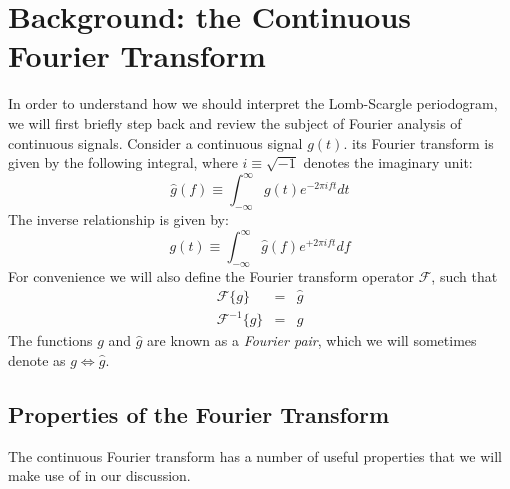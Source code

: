 \documentclass[preprint]{aastex}
\newcommand{\eqlabel}[1]{\label{eq:#1}}
\newcommand{\sectlabel}[1]{\label{sect:#1}}
\begin{document}
\section{Background: the Continuous Fourier Transform}
\sectlabel{continuous-fourier-transform}

In order to understand how we should interpret the Lomb-Scargle periodogram, we will first briefly step back and review the subject of Fourier analysis of continuous signals.
Consider a continuous signal $g(t)$.
its Fourier transform is given by the following integral, where $i\equiv\sqrt{-1}$ denotes the imaginary unit:
\begin{equation}
    \hat{g}(f) \equiv \int_{-\infty}^\infty g(t) e^{-2\pi i f t} dt
    \eqlabel{FT-def}
\end{equation}
The inverse relationship is given by:
\begin{equation}
    g(t) \equiv \int_{-\infty}^\infty \hat{g}(f) e^{+2\pi i f t} df
    \eqlabel{IFT-def}
\end{equation}
For convenience we will also define the Fourier transform operator
$\mathcal{F}$, such that
\begin{eqnarray}
    \mathcal{F}\{g\} &=& \hat{g} \\
    \mathcal{F}^{-1}\{\hat{g}\} &=& g
\end{eqnarray}
The functions $g$ and $\hat{g}$ are known as a {\it Fourier pair}, which we
will sometimes denote as $g \Longleftrightarrow \hat{g}$.

\subsection{Properties of the Fourier Transform}
\sectlabel{ft-properties}
The continuous Fourier transform has a number of useful properties that we will make use of in our discussion.
\end{document}
